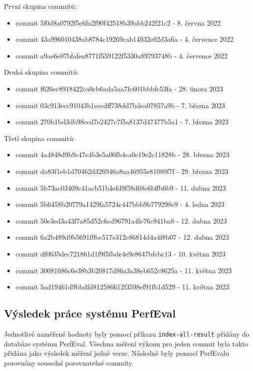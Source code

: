 \medskip

První skupina commitů:
\begin{itemize}
    \item commit 5f0d8a0792f5c6fa2f90f42518b39abb242f21c2 - 8. června 2022
    \item commit 43a996010438ab8784c19269cab14932e02d3a6a - 4. července 2022
    \item commit a9ae6e07bfafea8771f559122f5330a89793748b - 4. července 2022
\end{itemize}

Druhá skupina commitů:
\begin{itemize}
    \item commit f626ec8918422ca0cb6ada5aa7fc601bbbfc53fa - 28. února 2023
    \item commit 03c913ecc91043b1cecdff738dd7bdea07857a9b - 7. března 2023
    \item commit 270b1bd3db98ccd7e2427c7f5a8137d47477b5a1 - 7. března 2023
\end{itemize}

Třetí skupina commitů:
\begin{itemize}
    \item commit 4a4848d9b9c47e4b3e5a00fb4ca0e19e2c11828b - 28. března 2023
    \item commit da83f1eb1d70462d326946a8aa46955e81080f7f - 29. března 2023
    \item commit 5b73ac03409c41acb51b4efd9f58d68c6bffb6b9 - 11. dubna 2023
    \item commit 5b6458b20779a1429fa5724c447bbb9b779298e9 - 4. ledna 2023
    \item commit 50e3ed3a43f7a85d52c6cd96791a4fe76c941ba8 - 12. dubna 2023
    \item commit 6a2b489d9b5691f9bc517e312c86814d4a4f8b07 - 12. dubna 2023
    \item commit df0635dec721861d1f9f5fbde4e9e8647bfebc13 - 10. května 2023
    \item commit 30081686c6e38b3b20817d86a3a38eb652c8625a - 11. května 2023
    \item commit 5ad19461d9bbdfd812586612f3598ef91fb1d529 - 11. května 2023
\end{itemize}

\subsection{Výsledek práce systému PerfEval}

Jednotlivé naměřené hodnoty byly pomocí příkazu \lstinline{index-all-result} přidány do databáze systému PerfEval.
Všechna měření výkonu pro jeden commit byla takto přidána jako výsledek měření jedné verze.
Následně byly pomocí PerfEvalu porovnány sousední porovnatelné commity.

